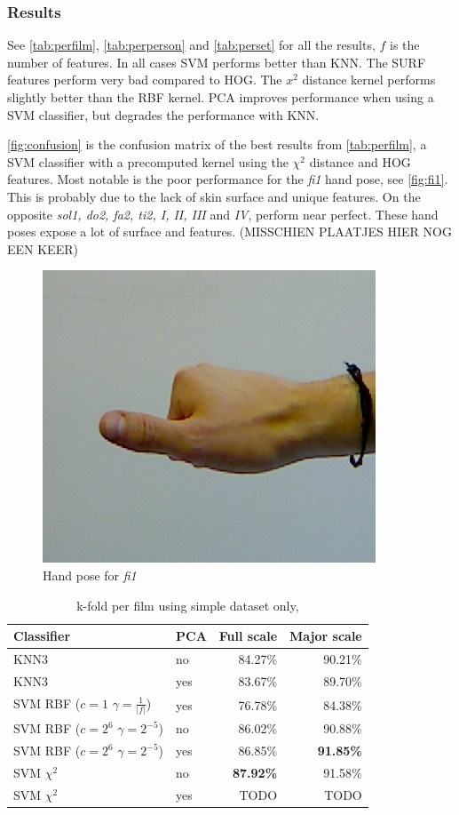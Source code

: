 \subsubsection{Results}
See \autoref{tab:perfilm}, \autoref{tab:perperson} and \autoref{tab:perset} for all the results, $f$ is the number of features. In all cases SVM performs better than KNN. The SURF features perform very bad compared to HOG. The $x^2$ distance kernel performs slightly better than the RBF kernel.  PCA improves performance when using a SVM classifier, but degrades the performance with KNN. 

\autoref{fig:confusion} is the confusion matrix of the best results from \autoref{tab:perfilm}, a SVM classifier with a precomputed kernel using the $\chi^2$ distance and HOG features. Most notable is the poor performance for the \emph{fi1} hand pose, see \autoref{fig:fi1}. This is probably due to the lack of skin surface and unique features. On the opposite \emph{sol1, do2, fa2, ti2, I, II, III }and \emph{IV}, perform near perfect. These hand poses expose a lot of surface and features. (MISSCHIEN PLAATJES HIER NOG EEN KEER)

\begin{figure}[htbp]
  \centering
  \includegraphics[width=0.2\linewidth]{figures/examples/6.jpg}
  \caption{Hand pose for \emph{fi1}}
  \label{fig:fi1}
\end{figure}


\begin{table}
\centering
\begin{tabular}{llrr}
\hline\hline
Classifier 		& PCA		&  	Full scale	& Major scale	\\
\hline
KNN3 		&	no	&  	84.27\%		& 90.21\%		\\
KNN3	 	&	yes	& 	83.67\%		& 89.70\%		\\
SVM RBF ($c=1$ $\gamma=\frac{1}{|f|}$)	&	yes	& 	76.78\%	& 84.38\%	\\
SVM RBF ($c=2^6$ $\gamma=2^{-5}$)		&	no	&	86.02\%	& 90.88\% \\
SVM RBF ($c=2^6$ $\gamma=2^{-5}$)		&	yes	& 	86.85\% & \textbf{91.85\%} \\
SVM $\chi^2$ &	no	&	\textbf{87.92\%}		& 91.58\% \\
SVM $\chi^2$ &	yes	&	TODO		& TODO \\
\hline
\end{tabular}
\caption{k-fold per film using simple dataset only,}
\label{tab:perfilm}
\end{table}



